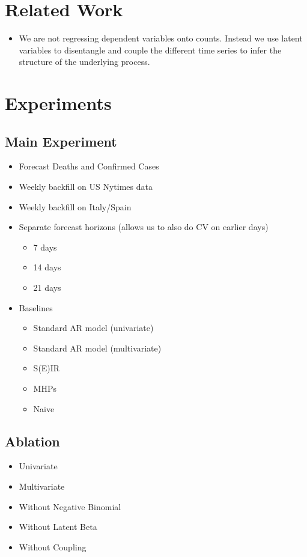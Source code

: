 \documentclass{article}
\begin{document}
\section{Related Work}
\label{sec:orgaf7d266}
\cite{lloyd_smith2007negativebinomial}
\begin{itemize}
\item We are not regressing dependent variables onto counts. Instead we use latent
variables to disentangle and couple the different time series to infer the
structure of the underlying process.
\end{itemize}

\section{Experiments}
\label{sec:orgd2a2489}
\subsection{Main Experiment}
\label{sec:org931ecc2}
\begin{itemize}
\item Forecast Deaths and Confirmed Cases
\item Weekly backfill on US Nytimes data
\item Weekly backfill on Italy/Spain
\item Separate forecast horizons (allows us to also do CV on earlier days)
\begin{itemize}
\item 7 days
\item 14 days
\item 21 days
\end{itemize}
\item Baselines
\begin{itemize}
\item Standard AR model (univariate)
\item Standard AR model (multivariate)
\item S(E)IR
\item MHPs
\item Naive
\end{itemize}
\end{itemize}
\subsection{Ablation}
\label{sec:org898a4bb}
\begin{itemize}
\item Univariate
\item Multivariate
\item Without Negative Binomial
\item Without Latent Beta
\item Without Coupling
\end{itemize}
\end{document}
